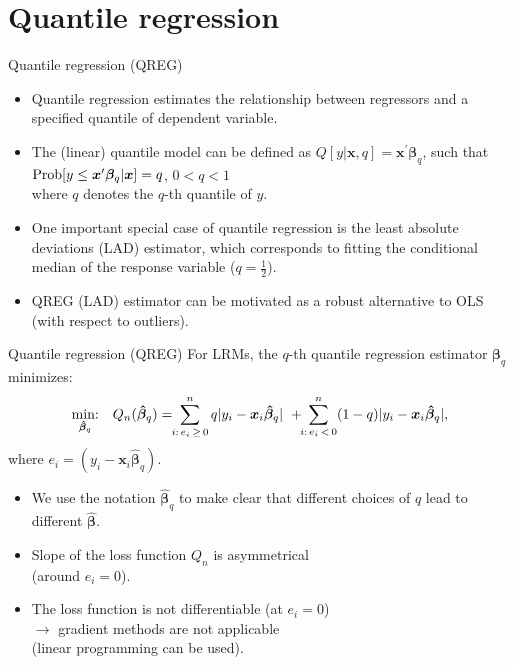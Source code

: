 \documentclass{beamer}
\begin{document}
\section{Quantile regression}
\begin{frame}{Quantile regression (QREG)}
\begin{itemize}
\item Quantile regression estimates the relationship between regressors and a specified quantile of dependent variable.
\medskip
\item The (linear) quantile model can be defined as $Q[y|\bm{x}, q]=\bm{x}^{\prime}\bm{\beta}_q$, such that $\textnormal{Prob}[y \le \bm{x}^{\prime}\bm{\beta}_q|\bm{x}]=q$, $0<q<1$ \\where $q$ denotes the $q$-th quantile of $y$.
\medskip
\item One important special case of quantile regression is the least absolute deviations (LAD) estimator, which corresponds to fitting the conditional median of the response variable ($q=\frac{1}{2}$).
\medskip
\item QREG (LAD) estimator can be motivated as a robust  alternative to OLS (with respect to outliers).
\end{itemize}
\end{frame}
\begin{frame}{Quantile regression (QREG)}
For LRMs, the $q$-th quantile regression estimator $\bm{\beta}_q$ minimizes:
$$
\underset{\bm{\hat{\beta}}_q}{\textnormal{min:}} \quad Q_n(\bm{\hat{\beta}}_q) =
\! \! \sum^n_{i:\, e_i \, \geq \, 0} q|y_i - \bm{x}_i\bm{\hat{\beta}}_q| \,\, +
\! \! \sum^n_{i:\, e_i\, < \, 0} (1-q)|y_i - \bm{x}_i\bm{\hat{\beta}}_q|,
$$
where $e_i = (y_i - \bm{x}_i\bm{\hat{\beta}}_q)$.

\begin{itemize}
    \item We use the notation $\bm{\hat{\beta}}_q$ to make clear that different choices of $q$ lead to different  $\bm{\hat{\beta}}$.
    \item Slope of the loss function $Q_n$ is asymmetrical \\(around $e_i=0$).
    \item The loss function is not differentiable (at $e_i=0$) \\$\rightarrow$ gradient methods are not applicable \\(linear programming can be used).
\end{itemize}
\end{frame}
\end{document}
